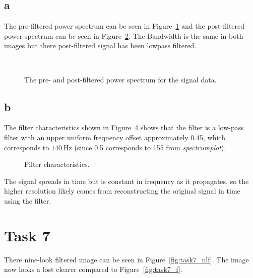 \documentclass[12pt,a4paper]{article}
\begin{document}
\subsection{a}
The pre-filtered power spectrum can be seen in Figure~\ref{fig:task6_pre} and the post-filtered power spectrum can be seen in Figure~\ref{fig:task6_post}. The Bandwidth is the same in both images but there post-filtered signal has been lowpass filtered.
\begin{figure}[ht!]
  \centering
    \begin{subfigure}[b]{0.59\textwidth}
        \noindent\makebox[\textwidth]{\scalebox{0.50}{}}
        \label{fig:task6_pre}
    \end{subfigure}\\
    \begin{subfigure}[b]{0.59\textwidth}
        \noindent\makebox[\textwidth]{\scalebox{0.50}{}}
        \label{fig:task6_post}
    \end{subfigure}
  \caption{The pre- and post-filtered power spectrum for the signal data.}
  \label{fig:task6}
\end{figure}

\subsection{b}
The filter characteristics shown in Figure~\ref{fig:task6_filter} shows that the filter is a low-pass filter with an upper uniform frequency offset approximately 0.45, which corresponds to $\SI{140}{\hertz}$ (since 0.5 corresponds to 155 from \textit{spectrumplot}).
\begin{figure}[ht!]
  \centering
  \noindent\makebox[\textwidth]{\scalebox{0.90}{}}
  \caption{Filter characteristics.}
  \label{fig:task6_filter}
\end{figure}

The signal spreads in time but is constant in frequency as it propagates, so the higher resolution likely comes from reconstructing the original signal in time using the filter.

\section{Task 7}
There nine-look filtered image can be seen in Figure~\ref{fig:task7_nlf}. The image now looks a lost clearer compared to Figure~\ref{fig:task7_f}.
\end{document}
